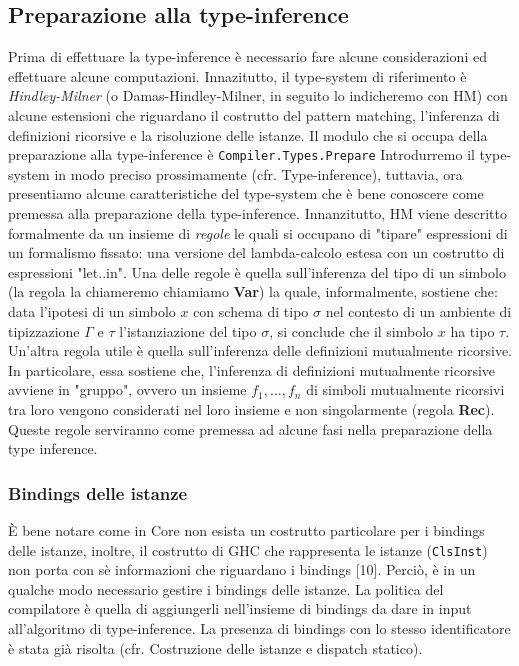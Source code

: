 \documentclass[10pt,a4paper]{article}
\begin{document}
\subsection{Preparazione alla type-inference}
Prima di effettuare la type-inference è necessario fare alcune considerazioni ed effettuare alcune computazioni.
Innazitutto, il type-system di riferimento è \textit{Hindley-Milner} (o Damas-Hindley-Milner, in seguito lo indicheremo con HM)
con alcune estensioni che riguardano il costrutto del pattern matching, l'inferenza di definizioni ricorsive e la
risoluzione delle istanze. Il modulo che si occupa della preparazione alla type-inference è \texttt{Compiler.Types.Prepare}
Introdurremo il type-system in modo preciso prossimamente (cfr. Type-inference), tuttavia, ora presentiamo alcune
caratteristiche del type-system che è bene conoscere come premessa alla preparazione della type-inference.
Innanzitutto, HM viene descritto formalmente da un insieme di \textit{regole} le quali si occupano di "tipare"
espressioni di un formalismo fissato: una versione del lambda-calcolo estesa con un costrutto di espressioni "let..in".
Una delle regole è quella sull'inferenza del tipo di un simbolo (la regola la chiameremo chiamiamo \textbf{Var})
la quale, informalmente, sostiene che: data l'ipotesi di un simbolo $ x $ con schema di tipo $ \sigma $ nel contesto di
un ambiente di tipizzazione $ \Gamma $ e $ \tau $ l'istanziazione del tipo $ \sigma $, si conclude che il simbolo
$ x $ ha tipo $ \tau $.
Un'altra regola utile è quella
sull'inferenza delle definizioni mutualmente ricorsive. In particolare, essa sostiene che, l'inferenza di definizioni
mutualmente ricorsive avviene in "gruppo", ovvero un insieme $ {f_1, ..., f_n} $ di simboli mutualmente ricorsivi
tra loro vengono considerati nel loro insieme e non singolarmente (regola \textbf{Rec}).
Queste regole serviranno come premessa ad alcune fasi nella preparazione della type inference.

\subsubsection{Bindings delle istanze}
\`E bene notare come in Core non esista un costrutto particolare per i bindings delle istanze, inoltre, il
costrutto di GHC che rappresenta le istanze (\texttt{ClsInst}) non porta con sè informazioni che riguardano i
bindings [10].
Perciò, è in un qualche modo necessario gestire i bindings delle istanze. La politica del compilatore è quella di
aggiungerli nell'insieme di bindings da dare in input all'algoritmo di type-inference. La presenza di bindings con lo
stesso identificatore è stata già risolta (cfr. Costruzione delle istanze e dispatch statico).
\end{document}
